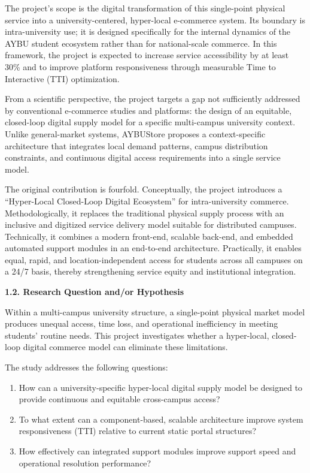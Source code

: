 \documentclass[10pt,a4paper]{article}
\begin{document}
The project's scope is the digital transformation of this single-point physical service into a university-centered, hyper-local e-commerce system. Its boundary is intra-university use; it is designed specifically for the internal dynamics of the AYBU student ecosystem rather than for national-scale commerce. In this framework, the project is expected to increase service accessibility by at least 30\% and to improve platform responsiveness through measurable Time to Interactive (TTI) optimization.

From a scientific perspective, the project targets a gap not sufficiently addressed by conventional e-commerce studies and platforms: the design of an equitable, closed-loop digital supply model for a specific multi-campus university context. Unlike general-market systems, AYBUStore proposes a context-specific architecture that integrates local demand patterns, campus distribution constraints, and continuous digital access requirements into a single service model.

The original contribution is fourfold. Conceptually, the project introduces a ``Hyper-Local Closed-Loop Digital Ecosystem'' for intra-university commerce. Methodologically, it replaces the traditional physical supply process with an inclusive and digitized service delivery model suitable for distributed campuses. Technically, it combines a modern front-end, scalable back-end, and embedded automated support modules in an end-to-end architecture. Practically, it enables equal, rapid, and location-independent access for students across all campuses on a 24/7 basis, thereby strengthening service equity and institutional integration.

\textbf{1.2. Research Question and/or Hypothesis}

Within a multi-campus university structure, a single-point physical market model produces unequal access, time loss, and operational inefficiency in meeting students' routine needs. This project investigates whether a hyper-local, closed-loop digital commerce model can eliminate these limitations.

The study addresses the following questions:
\begin{enumerate}
    \item How can a university-specific hyper-local digital supply model be designed to provide continuous and equitable cross-campus access?
    \item To what extent can a component-based, scalable architecture improve system responsiveness (TTI) relative to current static portal structures?
    \item How effectively can integrated support modules improve support speed and operational resolution performance?
\end{enumerate}
\end{document}
